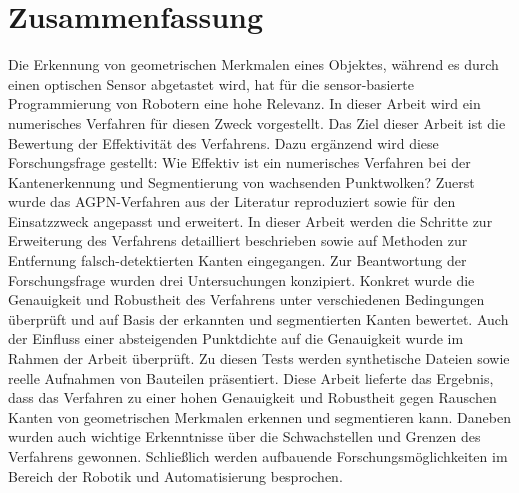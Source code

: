 \section*{\centering Zusammenfassung}
Die Erkennung von geometrischen Merkmalen eines Objektes, während es durch einen optischen Sensor abgetastet wird, hat für die sensor-basierte Programmierung von Robotern eine hohe Relevanz. In dieser Arbeit wird ein numerisches Verfahren für diesen Zweck vorgestellt. Das Ziel dieser Arbeit ist die Bewertung der Effektivität des Verfahrens. Dazu ergänzend wird diese Forschungsfrage gestellt: Wie Effektiv ist ein numerisches Verfahren bei der Kantenerkennung und Segmentierung von wachsenden Punktwolken? Zuerst wurde das AGPN-Verfahren aus der Literatur reproduziert sowie für den Einsatzzweck angepasst und erweitert. In dieser Arbeit werden die Schritte zur Erweiterung des Verfahrens detailliert beschrieben sowie auf Methoden zur Entfernung falsch-detektierten Kanten eingegangen. Zur Beantwortung der Forschungsfrage wurden drei Untersuchungen konzipiert. Konkret wurde die Genauigkeit und Robustheit des Verfahrens unter verschiedenen Bedingungen überprüft und auf Basis der erkannten und segmentierten Kanten bewertet. Auch der Einfluss einer absteigenden Punktdichte auf die Genauigkeit wurde im Rahmen der Arbeit überprüft. Zu diesen Tests werden synthetische Dateien sowie reelle Aufnahmen von Bauteilen präsentiert. Diese Arbeit lieferte das Ergebnis, dass das Verfahren zu einer hohen Genauigkeit und Robustheit gegen Rauschen Kanten von geometrischen Merkmalen erkennen und segmentieren kann. Daneben wurden auch wichtige Erkenntnisse über die Schwachstellen und Grenzen des Verfahrens gewonnen. Schließlich werden aufbauende Forschungsmöglichkeiten im Bereich der Robotik und Automatisierung besprochen.


